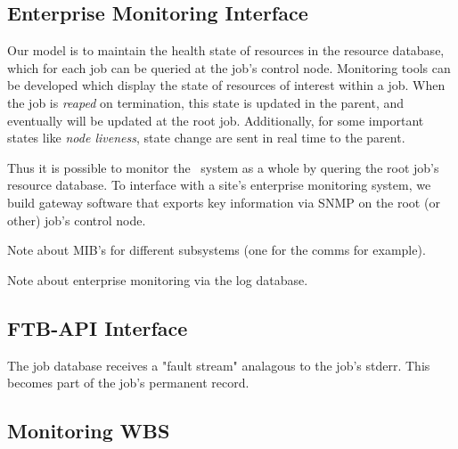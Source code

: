 \subsection{Enterprise Monitoring Interface}

Our model is to maintain the health state of resources in the resource
database, which for each job can be queried at the job's control node.
Monitoring tools can be developed which display the state of resources
of interest within a job.  When the job is {\em reaped} on termination,
this state is updated in the parent, and eventually will be updated
at the root job.  Additionally, for some important states like {\em node
liveness}, state change are sent in real time to the parent.

Thus it is possible to monitor the \ngrm\ system as a whole by quering
the root job's resource database.  To interface with a site's enterprise
monitoring system, we build gateway software that exports key information
via SNMP on the root (or other) job's control node.

Note about MIB's for different subsystems (one for the comms for example).

Note about enterprise monitoring via the log database.

\subsection{FTB-API Interface}

The job database receives a "fault stream" analagous to the job's stderr.
This becomes part of the job's permanent record.

\subsection{Monitoring WBS}

